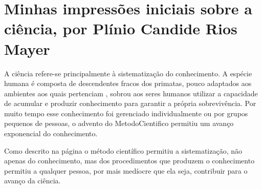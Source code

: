 \section{Minhas impressões iniciais sobre a ciência, por Plínio Candide Rios Mayer}


A ciência refere-se principalmente à sistematização do conhecimento. A espécie humana é composta de descendentes fracos dos primatas, pouco adaptados aos ambientes aos quais pertenciam , sobrou aos seres humanos utilizar a capacidade de acumular e produzir conhecimento para garantir a própria sobrevivência. Por muito tempo esse conhecimento foi gerenciado individualmente ou por grupos pequenos de pessoas, o advento do \gls{MetodoCientifico} permitiu um avanço exponencial do conhecimento.

Como descrito na página \citet{wikipedia_metodo_2021} o método científico permitiu a sistematização, não apenas do conhecimento, mas dos procedimentos que produzem o conhecimento permitiu a qualquer pessoa, por mais medíocre que ela seja, contribuir para o avanço da ciência.
